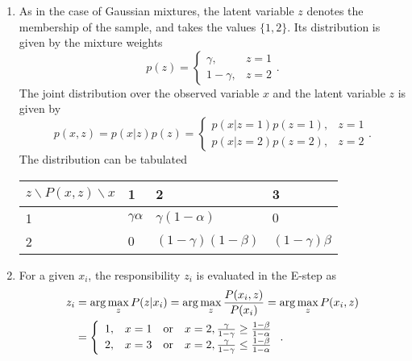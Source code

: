 \documentclass[a4paper, 10pt]{article}
\begin{document}
\begin{enumerate}[label=(\alph*)]
    \item As in the case of Gaussian mixtures, the latent variable $z$ denotes the membership of the sample, and takes the values $\{1, 2\}$. Its distribution is given by the mixture weights
    \begin{equation}
        p(z) = \left\{\begin{array}{ll}
            \gamma, &z=1 \\
            1 - \gamma, &z=2
        \end{array}\right. .
    \end{equation}
    The joint distribution over the observed variable $x$ and the latent variable $z$ is given by
    \begin{equation}
        p(x, z) = p(x|z) p(z) = \left\{\begin{array}{ll}
            p(x|z=1) p(z=1), & z=1 \\ 
            p(x|z=2) p(z=2), & z=2
        \end{array}\right. .
    \end{equation}
    The distribution can be tabulated
    \begin{table}[h]
        \centering
        \begin{tabular}{p{2cm} | p{2cm} p{2cm} p{2cm}}
            \toprule
            $z\backslash P(x, z) \backslash x$ & 1 & 2 & 3 \\ 
            \midrule
            1 & $\gamma\alpha$ & $\gamma(1 - \alpha)$ & $0$ \\ 
            2 & $0$ & $(1 - \gamma)(1 - \beta)$ & $(1 - \gamma) \beta$ \\
            \bottomrule
        \end{tabular}
    \end{table}

    \item For a given $x_i$, the responsibility $z_i$ is evaluated in the E-step as
    \begin{equation}
        \begin{aligned}
            z_i &= \arg \max_z P(z|x_i) = \arg \max_z \frac{P(x_i, z)}{P(x_i)} = \arg \max_z P(x_i, z) \\ 
            &= \left\{\begin{array}{lll}
                1, & x=1\quad {\rm or} & x=2, \frac{\gamma}{1 - \gamma} \geq \frac{1 - \beta}{1 - \alpha} \\ 
                2, & x=3\quad {\rm or} & x=2, \frac{\gamma}{1 - \gamma} \leq \frac{1 - \beta}{1 - \alpha}
            \end{array}\right. .
        \end{aligned}
    \end{equation}


\end{enumerate}
\end{document}
